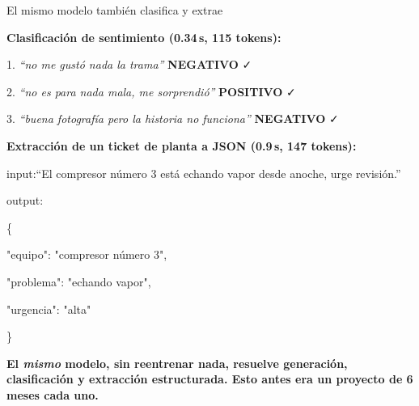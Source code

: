 \documentclass[aspectratio=169, 11pt]{beamer}
\begin{document}
\begin{frame}[shrink]{El mismo modelo también clasifica y extrae}
  \vspace{2pt}
  {\footnotesize\color{arcaDark}\textbf{Clasificación de sentimiento (0.34\,s, 115 tokens):}\par}
  \begin{tcolorbox}[colback=arcaGray, colframe=codeBlue, leftrule=3pt,
    boxrule=0pt, sharp corners, left=8pt, right=8pt, top=2pt, bottom=2pt]
    {\scriptsize\color{textDark}
    1. \textit{``no me gustó nada la trama''} \;\faArrowRight\; \textbf{\color{codeGreen}NEGATIVO} \faCheck\par
    2. \textit{``no es para nada mala, me sorprendió''} \;\faArrowRight\; \textbf{\color{codeGreen}POSITIVO} \faCheck\par
    3. \textit{``buena fotografía pero la historia no funciona''} \;\faArrowRight\; \textbf{\color{codeGreen}NEGATIVO} \faCheck}
  \end{tcolorbox}
  \vspace{6pt}
  {\footnotesize\color{arcaDark}\textbf{Extracción de un ticket de planta a JSON (0.9\,s, 147 tokens):}\par}
  \begin{tcolorbox}[colback=arcaGray, colframe=codeOrange, leftrule=3pt,
    boxrule=0pt, sharp corners, left=8pt, right=8pt, top=2pt, bottom=2pt]
    {\scriptsize\ttfamily\color{textDark}
    input:\;``El compresor número 3 está echando vapor desde anoche, urge revisión.''\par
    \vspace{2pt}
    output:\par
    \{\par
    \quad"equipo": "compresor número 3",\par
    \quad"problema": "echando vapor",\par
    \quad"urgencia": "alta"\par
    \}}
  \end{tcolorbox}
  \vspace{4pt}
  {\footnotesize\color{arcaDark}\bfseries
  El \emph{mismo} modelo, sin reentrenar nada, resuelve generación, clasificación
  y extracción estructurada. Esto antes era un proyecto de 6 meses cada uno.}
\end{frame}
\end{document}
